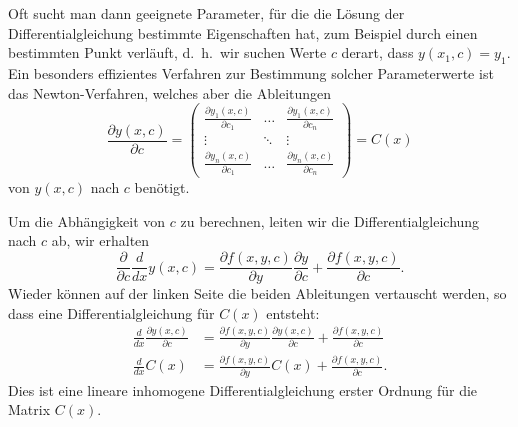 Oft sucht man dann geeignete Parameter, für die die Lösung der
Differentialgleichung bestimmte Eigenschaften hat, zum Beispiel durch
einen bestimmten Punkt verläuft, d.~h.~wir suchen Werte $c$ derart,
dass $y(x_1,c)=y_1$.
Ein besonders effizientes Verfahren zur Bestimmung solcher Parameterwerte
ist das Newton-Verfahren, welches aber die Ableitungen
%
\[
\frac{\partial y(x,c)}{\partial c}
=
\begin{pmatrix}
\displaystyle \frac{\partial y_1(x,c)}{\partial c_1}
	&\dots
		&\displaystyle \frac{\partial y_1(x,c)}{\partial c_n}\\
\vdots
	&\ddots
		&\vdots\\
\displaystyle \frac{\partial y_n(x,c)}{\partial c_1}
	&\dots
		&\displaystyle \frac{\partial y_n(x,c)}{\partial c_n}
\end{pmatrix}
=C(x)
\]
von $y(x,c)$ nach $c$ benötigt.

Um die Abhängigkeit von $c$ zu berechnen, leiten wir die
Differentialgleichung nach $c$ ab, wir erhalten 
\[
\frac{\partial}{\partial c} \frac{d}{dx} y(x,c)
=
\frac{\partial f(x,y,c)}{\partial y}\frac{\partial y}{\partial c}
+
\frac{\partial f(x,y,c)}{\partial c}.
\]
Wieder können auf der linken Seite die beiden Ableitungen vertauscht
werden, so dass eine Differentialgleichung für $C(x)$ entsteht:
\begin{align*}
\frac{d}{dx}\frac{\partial y(x,c)}{\partial c}
&=
\frac{\partial f(x,y,c)}{\partial y}\frac{\partial y(x,c)}{\partial c}
+
\frac{\partial f(x,y,c)}{\partial c}
\\
\frac{d}{dx}C(x)
&=
\frac{\partial f(x,y,c)}{\partial y}C(x)
+
\frac{\partial f(x,y,c)}{\partial c}.
\end{align*}
Dies ist eine lineare inhomogene Differentialgleichung erster Ordnung
für die Matrix $C(x)$.

